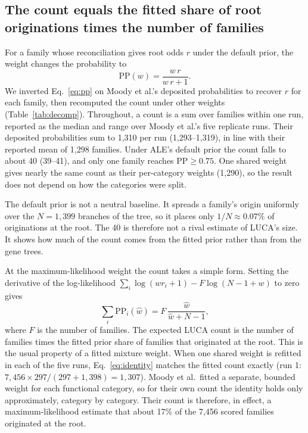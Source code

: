 \documentclass[11pt]{article}
\newcommand{\PP}{\mathrm{PP}}
\begin{document}
\subsection{The count equals the fitted share of root originations times the number of families}\label{sec:decomp}
For a family whose reconciliation gives root odds $r$ under the default prior, the weight changes the probability to
\begin{equation}
  \PP(w) = \frac{w\,r}{w\,r + 1}.
  \label{eq:pp}
\end{equation}
We inverted Eq.~\eqref{eq:pp} on Moody et al.'s deposited probabilities to recover $r$ for each family, then recomputed the count under other weights (Table~\ref{tab:decomp}). Throughout, a count is a sum over families within one run, reported as the median and range over Moody et al.'s five replicate runs. Their deposited probabilities sum to 1,310 per run (1,293--1,319), in line with their reported mean of 1,298 families. Under ALE's default prior the count falls to about 40 (39--41), and only one family reaches $\PP \ge 0.75$. One shared weight gives nearly the same count as their per-category weights (1,290), so the result does not depend on how the categories were split.

The default prior is not a neutral baseline. It spreads a family's origin uniformly over the $N = 1{,}399$ branches of the tree, so it places only $1/N \approx 0.07\%$ of originations at the root. The 40 is therefore not a rival estimate of LUCA's size. It shows how much of the count comes from the fitted prior rather than from the gene trees.

At the maximum-likelihood weight the count takes a simple form. Setting the derivative of the log-likelihood $\sum_i \log(w r_i + 1) - F \log(N - 1 + w)$ to zero gives
\begin{equation}
  \sum_i \PP_i(\hat w) = F\,\frac{\hat w}{\hat w + N - 1},
  \label{eq:identity}
\end{equation}
where $F$ is the number of families. The expected LUCA count is the number of families times the fitted prior share of families that originated at the root. This is the usual property of a fitted mixture weight. When one shared weight is refitted in each of the five runs, Eq.~\eqref{eq:identity} matches the fitted count exactly (run 1: $7{,}456 \times 297/(297+1{,}398) = 1{,}307$). Moody et al.\ fitted a separate, bounded weight for each functional category, so for their own count the identity holds only approximately, category by category. Their count is therefore, in effect, a maximum-likelihood estimate that about 17\% of the 7,456 scored families originated at the root.
\end{document}
